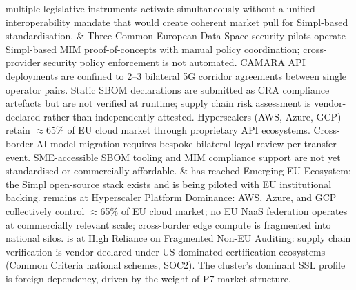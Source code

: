 \begin{landscape}
\begin{longtable}
{multiple legislative instruments activate simultaneously without
a unified interoperability mandate that would create coherent market
pull for Simpl-based standardisation.}
&
Three Common European Data Space security pilots operate Simpl-based
MIM proof-of-concepts with manual policy coordination; cross-provider
security policy enforcement is not automated. CAMARA API deployments
are confined to 2--3 bilateral 5G corridor agreements between single
operator pairs. Static SBOM declarations are submitted as CRA
compliance artefacts but are not verified at runtime; supply chain
risk assessment is vendor-declared rather than independently attested.
Hyperscalers (AWS, Azure, GCP) retain $\approx$65\% of EU cloud market
through proprietary API ecosystems. Cross-border AI model migration
requires bespoke bilateral legal review per transfer event. SME-accessible
SBOM tooling and MIM compliance support are not yet standardised or
commercially affordable.
&
 has reached Emerging EU Ecosystem: the Simpl open-source
stack exists and is being piloted with EU institutional backing.
 remains at Hyperscaler Platform Dominance: AWS, Azure, and GCP
collectively control $\approx$65\% of EU cloud market; no EU NaaS
federation operates at commercially relevant scale; cross-border edge
compute is fragmented into national silos.  is at High
Reliance on Fragmented Non-EU Auditing: supply chain verification
is vendor-declared under US-dominated certification ecosystems (Common
Criteria national schemes, SOC2). The cluster's dominant SSL profile
is foreign dependency, driven by the weight of P7 market structure.
\\
\hline


\end{longtable}
\end{landscape}
